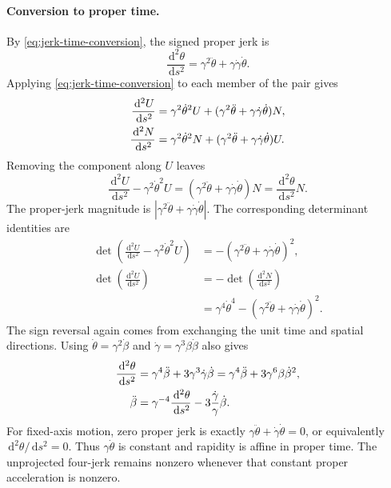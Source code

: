 \documentclass[11pt]{article}
\newcommand{\pv}[1]{{#1}}
\newcommand{\pN}{\pv{N}}
\newcommand{\pU}{\pv{U}}
\numberwithin{equation}{section}
\newcommand{\dd}{\,\mathrm d}
\begin{document}
\paragraph{Conversion to proper time.}
By \eqref{eq:jerk-time-conversion}, the signed proper jerk is
\[
 \frac{\dd^2\theta}{\dd s^2}
 =\gamma^2\ddot{\theta}+\gamma\dot{\gamma}\dot{\theta}.
\]
Applying \eqref{eq:jerk-time-conversion} to each member of the pair gives
\begin{align}
 \frac{\dd^2\pU}{\dd s^2}
 &=\gamma^2\dot{\theta}^2\pU
 +(\gamma^2\ddot{\theta}+\gamma\dot{\gamma}\dot{\theta})\pN,\notag\\
 \frac{\dd^2\pN}{\dd s^2}
 &=\gamma^2\dot{\theta}^2\pN
 +(\gamma^2\ddot{\theta}+\gamma\dot{\gamma}\dot{\theta})\pU.
 \label{eq:rectilinear-jerk}
\end{align}
Removing the component along $\pU$ leaves
\[
 \frac{\dd^2\pU}{\dd s^2}-\gamma^2\dot{\theta}^2\pU
 =(\gamma^2\ddot{\theta}+\gamma\dot{\gamma}\dot{\theta})\pN
 =\frac{\dd^2\theta}{\dd s^2}\pN.
\]
The proper-jerk magnitude is
$\left|\gamma^2\ddot{\theta}+\gamma\dot{\gamma}\dot{\theta}\right|$.
The corresponding determinant identities are
\begin{align*}
 \det\left(\frac{\dd^2\pU}{\dd s^2}-\gamma^2\dot{\theta}^2\pU\right)
 &=-(\gamma^2\ddot{\theta}+\gamma\dot{\gamma}\dot{\theta})^2,\\
 \det\left(\frac{\dd^2\pU}{\dd s^2}\right)
 &=-\det\left(\frac{\dd^2\pN}{\dd s^2}\right)\\
 &=\gamma^4\dot{\theta}^4
 -(\gamma^2\ddot{\theta}+\gamma\dot{\gamma}\dot{\theta})^2.
\end{align*}
The sign reversal again comes from exchanging the unit time and spatial
directions. Using $\dot{\theta}=\gamma^2\dot{\beta}$ and
$\dot{\gamma}=\gamma^3\beta\dot{\beta}$ also gives
\begin{align}
 \frac{\dd^2\theta}{\dd s^2}
 &=\gamma^4\ddot{\beta}+3\gamma^3\dot{\gamma}\dot{\beta}
 =\gamma^4\ddot{\beta}+3\gamma^6\beta\dot{\beta}^2,\notag\\
 \ddot{\beta}&=\gamma^{-4}\frac{\dd^2\theta}{\dd s^2}
 -3\frac{\dot{\gamma}}{\gamma}\dot{\beta}.
 \label{eq:coordinate-proper-jerk}
\end{align}
For fixed-axis motion, zero proper jerk is exactly
$\gamma\ddot{\theta}+\dot{\gamma}\dot{\theta}=0$, or equivalently
$\dd^2\theta/\dd s^2=0$. Thus $\gamma\dot{\theta}$ is constant and rapidity
is affine in proper time. The unprojected four-jerk remains nonzero
whenever that constant proper acceleration is nonzero.
\end{document}
